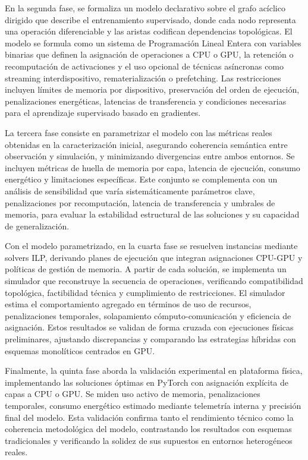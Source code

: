 En la segunda fase, se formaliza un modelo declarativo sobre el grafo acíclico dirigido que describe el entrenamiento supervisado, donde cada nodo representa una operación diferenciable y las aristas codifican dependencias topológicas. El modelo se formula como un sistema de Programación Lineal Entera con variables binarias que definen la asignación de operaciones a CPU o GPU, la retención o recomputación de activaciones y el uso opcional de técnicas asíncronas como streaming interdispositivo, rematerialización o prefetching. Las restricciones incluyen límites de memoria por dispositivo, preservación del orden de ejecución, penalizaciones energéticas, latencias de transferencia y condiciones necesarias para el aprendizaje supervisado basado en gradientes.

La tercera fase consiste en parametrizar el modelo con las métricas reales obtenidas en la caracterización inicial, asegurando coherencia semántica entre observación y simulación, y minimizando divergencias entre ambos entornos. Se incluyen métricas de huella de memoria por capa, latencia de ejecución, consumo energético y limitaciones específicas. Este conjunto se complementa con un análisis de sensibilidad que varía sistemáticamente parámetros clave, penalizaciones por recomputación, latencia de transferencia y umbrales de memoria, para evaluar la estabilidad estructural de las soluciones y su capacidad de generalización.

Con el modelo parametrizado, en la cuarta fase se resuelven instancias mediante solvers ILP, derivando planes de ejecución que integran asignaciones CPU-GPU y políticas de gestión de memoria. A partir de cada solución, se implementa un simulador que reconstruye la secuencia de operaciones, verificando compatibilidad topológica, factibilidad técnica y cumplimiento de restricciones. El simulador estima el comportamiento agregado en términos de uso de recursos, penalizaciones temporales, solapamiento cómputo-comunicación y eficiencia de asignación. Estos resultados se validan de forma cruzada con ejecuciones físicas preliminares, ajustando discrepancias y comparando las estrategias híbridas con esquemas monolíticos centrados en GPU.

Finalmente, la quinta fase aborda la validación experimental en plataforma física, implementando las soluciones óptimas en PyTorch con asignación explícita de capas a CPU o GPU. Se miden uso activo de memoria, penalizaciones temporales, consumo energético estimado mediante telemetría interna y precisión final del modelo. Esta validación confirma tanto el rendimiento técnico como la coherencia metodológica del modelo, contrastando los resultados con esquemas tradicionales y verificando la solidez de sus supuestos en entornos heterogéneos reales.

